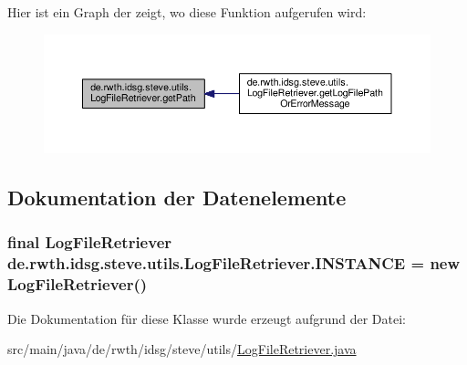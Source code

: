 Hier ist ein Graph der zeigt, wo diese Funktion aufgerufen wird\+:\nopagebreak
\begin{figure}[H]
\begin{center}
\leavevmode
\includegraphics[width=350pt]{classde_1_1rwth_1_1idsg_1_1steve_1_1utils_1_1_log_file_retriever_ae8f44ca96c1e0e94bd8e2814682f904a_icgraph}
\end{center}
\end{figure}




\subsection{Dokumentation der Datenelemente}
\hypertarget{classde_1_1rwth_1_1idsg_1_1steve_1_1utils_1_1_log_file_retriever_a6c781c54739ebb14c7702dd5f753ea59}{
\subsubsection[{I\+N\+S\+T\+A\+N\+C\+E}]{\setlength{\rightskip}{0pt plus 5cm}final {\bf Log\+File\+Retriever} de.\+rwth.\+idsg.\+steve.\+utils.\+Log\+File\+Retriever.\+I\+N\+S\+T\+A\+N\+C\+E = new {\bf Log\+File\+Retriever}()\hspace{0.3cm}{\ttfamily [static]}}}\label{classde_1_1rwth_1_1idsg_1_1steve_1_1utils_1_1_log_file_retriever_a6c781c54739ebb14c7702dd5f753ea59}


Die Dokumentation für diese Klasse wurde erzeugt aufgrund der Datei\+:\begin{DoxyCompactItemize}
\item 
src/main/java/de/rwth/idsg/steve/utils/\hyperlink{_log_file_retriever_8java}{Log\+File\+Retriever.\+java}\end{DoxyCompactItemize}
